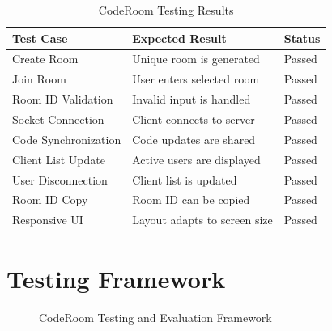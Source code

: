 \documentclass[12pt,a4paper,oneside]{report}
\begin{document}
\begin{table}[H]
\centering
\small
\begin{tabular}{p{5.5cm}p{3cm}p{3cm}}
\toprule
\textbf{Test Case} & \textbf{Expected Result} & \textbf{Status}\\
\midrule
Create Room & Unique room is generated & Passed\\
Join Room & User enters selected room & Passed\\
Room ID Validation & Invalid input is handled & Passed\\
Socket Connection & Client connects to server & Passed\\
Code Synchronization & Code updates are shared & Passed\\
Client List Update & Active users are displayed & Passed\\
User Disconnection & Client list is updated & Passed\\
Room ID Copy & Room ID can be copied & Passed\\
Responsive UI & Layout adapts to screen size & Passed\\
\bottomrule
\end{tabular}
\caption{CodeRoom Testing Results}
\label{tab:testing}
\end{table}

\section{Testing Framework}

\begin{figure}[H]
\centering


\caption{CodeRoom Testing and Evaluation Framework}
\label{fig:testingflow}

\end{figure}
\end{document}
